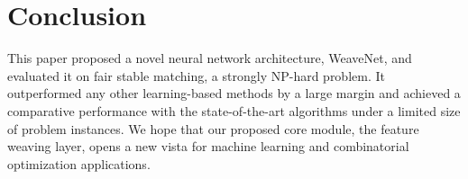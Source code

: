 \section{Conclusion}
This paper proposed a novel neural network architecture, WeaveNet, and evaluated it on fair stable matching, a strongly NP-hard problem. 
It outperformed any other learning-based methods by a large margin and achieved a comparative performance with the state-of-the-art algorithms under a limited size of problem instances.
We hope that our proposed core module, the feature weaving layer, opens a new vista for machine learning and combinatorial optimization applications.